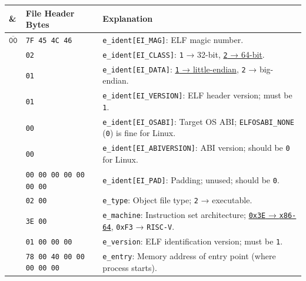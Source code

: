 \documentclass[a4paper,12pt,final]{article}
\begin{document}
\begin{table}[!htbp] \begin{adjustwidth}{-1cm}{-1cm} \fontsize{9}{10.800000}\selectfont
\begin{center}
\begin{tabular}{l|l|l}
\textbf{\&} & \textbf{File Header Bytes} & \textbf{Explanation}\\[0pt]
\hline
\(\overline{\texttt{00}}\) & \hspace{0.000000em}​\texttt{7F 45 4C 46} & \texttt{e\_ident[EI\_MAG]}: ELF magic number.\\[0pt]
 & \hspace{6.318000em}​\texttt{02} & \texttt{e\_ident[EI\_CLASS]}: \texttt{1} → 32-bit, \uline{\texttt{2} → 64-bit}.\\[0pt]
 & \hspace{7.897500em}​\texttt{01} & \texttt{e\_ident[EI\_DATA]}: \uline{\texttt{1} → little-endian}, \texttt{2} → big-endian.\\[0pt]
 & \hspace{9.477000em}​\texttt{01} & \texttt{e\_ident[EI\_VERSION]}: ELF header version; must be \texttt{1}.\\[0pt]
 & \hspace{11.056500em}​\texttt{00} & \texttt{e\_ident[EI\_OSABI]}: Target OS ABI; \texttt{ELFOSABI\_NONE} (\texttt{0}) is fine for Linux.\\[0pt]
 & \hspace{0.000000em}​\texttt{00} & \texttt{e\_ident[EI\_ABIVERSION]}: ABI version; should be \texttt{0} for Linux.\\[0pt]
 & \hspace{1.579500em}​\texttt{00 00 00 00 00 00 00} & \texttt{e\_ident[EI\_PAD]}: Padding; unused; should be \texttt{0}.\\[0pt]
\hline
 & \hspace{0.000000em}​\texttt{02 00} & \texttt{e\_type}: Object file type; \texttt{2} → executable.\\[0pt]
 & \hspace{3.159000em}​\texttt{3E 00} & \texttt{e\_machine}: Instruction set architecture; \uline{\texttt{0x3E} → \texttt{x86-64}}, \texttt{0xF3} → \texttt{RISC-V}.\\[0pt]
 & \hspace{6.318000em}​\texttt{01 00 00 00} & \texttt{e\_version}: ELF identification version; must be \texttt{1}.\\[0pt]
 & \hspace{0.000000em}​\texttt{78 00 40 00 00 00 00 00} & \texttt{e\_entry}: Memory address of entry point (where process starts).\\[0pt]

\end{tabular}
\end{center}
\end{adjustwidth}
\end{table}
\end{document}
